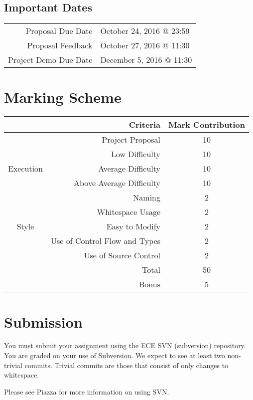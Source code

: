 \documentclass{article}
\begin{document}
\subsection*{Important Dates}
\begin{tabular}{rl}
Proposal Due Date & October 24, 2016 @ 23:59\\
Proposal Feedback & October 27, 2016 @ 11:30\\
Project Demo Due Date & December 5, 2016 @ 11:30
\end{tabular}

\section*{Marking Scheme}
\begin{center}
\begin{tabular}[c]{cr|c}
& \textbf{Criteria} & \textbf{Mark Contribution} \\ \hline

& Project Proposal & 10 \\ \hline

\multirow{3}{*}{Execution}
	& Low Difficulty & 10 \\
	& Average Difficulty & 10 \\
	& Above Average Difficulty & 10 \\ \hline

\multirow{5}{*}{Style} 
	& Naming & 2 \\
    & Whitespace Usage & 2 \\
	& Easy to Modify & 2 \\
	& Use of Control Flow and Types & 2 \\
	& Use of Source Control & 2 \\ \hhline{==|=}
	
& Total & 50 \\ \hhline{==|=}
& Bonus & 5
\end{tabular}
\end{center}

\section*{Submission}
You must submit your assignment using the ECE SVN (subversion) repository.  You are graded on your use of Subversion.  We expect to see at least two non-trivial commits. Trivial commits are those that consist of only changes to whitespace.

Please see Piazza for more information on using SVN.
\end{document}
